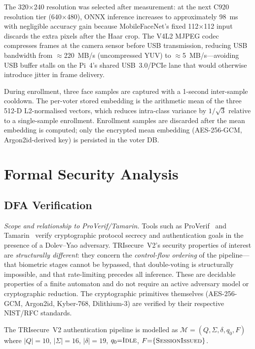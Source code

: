 \documentclass[pdflatex,sn-mathphys-num]{sn-jnl}%
\theoremstyle{thmstyleone}%
\theoremstyle{thmstyletwo}%
\theoremstyle{thmstylethree}%
\begin{document}
The 320$\times$240 resolution was selected after measurement: at the next C920
resolution tier (640$\times$480), ONNX inference increases to approximately
98~ms with negligible accuracy gain because MobileFaceNet's fixed
112$\times$112 input discards the extra pixels after the Haar crop. The V4L2
MJPEG codec compresses frames at the camera sensor before USB transmission,
reducing USB bandwidth from $\approx$220~MB/s (uncompressed YUV) to
$\approx$5~MB/s---avoiding USB buffer stalls on the Pi~4's shared USB~3.0/PCIe
lane that would otherwise introduce jitter in frame delivery.

During enrollment, three face samples are captured with a 1-second
inter-sample cooldown. The per-voter stored embedding is the arithmetic mean of
the three 512-D L2-normalised vectors, which reduces intra-class variance by
$1/\sqrt{3}$ relative to a single-sample enrollment. Enrollment samples are
discarded after the mean embedding is computed; only the encrypted mean
embedding (AES-256-GCM, Argon2id-derived key) is persisted in the voter DB.

\section{Formal Security Analysis}\label{sec:security}

\subsection{DFA Verification}\label{sec:dfa}

\textit{Scope and relationship to ProVerif/Tamarin.} Tools such as
ProVerif~\cite{blanchet2016proverif} and Tamarin~\cite{meier2013tamarin}
verify cryptographic protocol secrecy and authentication goals in the presence
of a Dolev--Yao adversary. TRIsecure~V2's security properties of interest are
\emph{structurally different}: they concern the \emph{control-flow ordering}
of the pipeline---that biometric stages cannot be bypassed, that double-voting
is structurally impossible, and that rate-limiting precedes all inference.
These are decidable properties of a finite automaton and do not require an
active adversary model or cryptographic reduction. The cryptographic primitives
themselves (AES-256-GCM, Argon2id, Kyber-768, Dilithium-3) are verified by
their respective NIST/RFC standards.

The TRIsecure~V2 authentication pipeline is modelled as \(\mathcal{M} =
(Q, \Sigma, \delta, q_0, F)\) where \(|Q|{=}10\), \(|\Sigma|{=}16\),
\(|\delta|{=}19\), \(q_0{=}\textsc{Idle}\),
\(F{=}\{\textsc{SessionIssued}\}\).
\end{document}
